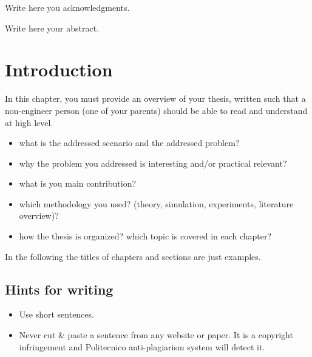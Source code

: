 \documentclass[a4paper,11pt,twoside,english]{toptesi}
\begin{document}
\english






\frontespizio %

\ringraziamenti

Write here you acknowledgments. 

\abstract
Write here your abstract.

\indici

\mainmatter

\chapter{Introduction}
In this chapter, you must provide an overview of your thesis, written such that a non-engineer person (one of your parents) should be able to read and understand at high level.
\begin{itemize}
\item what is the addressed scenario and the addressed problem?
\item why the problem you addressed is interesting and/or practical relevant?
\item what is you main contribution? 
\item which methodology you used? (theory, simulation, experiments, literature overview)?
\item how the thesis is organized? which topic is covered in each chapter?
 \end{itemize}
 
 In the following the titles of chapters and sections are just examples.
 
 \section{Hints for writing}
 
 \begin{itemize}
 \item Use short sentences.
 \item Never cut \& paste a sentence from any website or paper. It is a copyright infringement and Politecnico anti-plagiarism system will detect it.
 \end{itemize}
\end{document}
